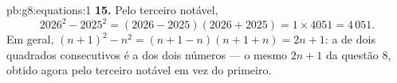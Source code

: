 \begin{solution}{pb:g8:equations:1}
\textbf{15.} Pelo terceiro  notável,
\[
2026^2 - 2025^2 = (2026 - 2025)(2026 + 2025)
= 1 \times 4051 = 4\,051 .
\]
Em geral, $(n+1)^2 - n^2 = (n + 1 - n)(n + 1 + n) = 2n + 1$: a
 de dois quadrados consecutivos é a  dos dois números ---
o mesmo $2n + 1$ da questão 8, obtido agora pelo terceiro 
notável em vez do primeiro.
\end{solution}
